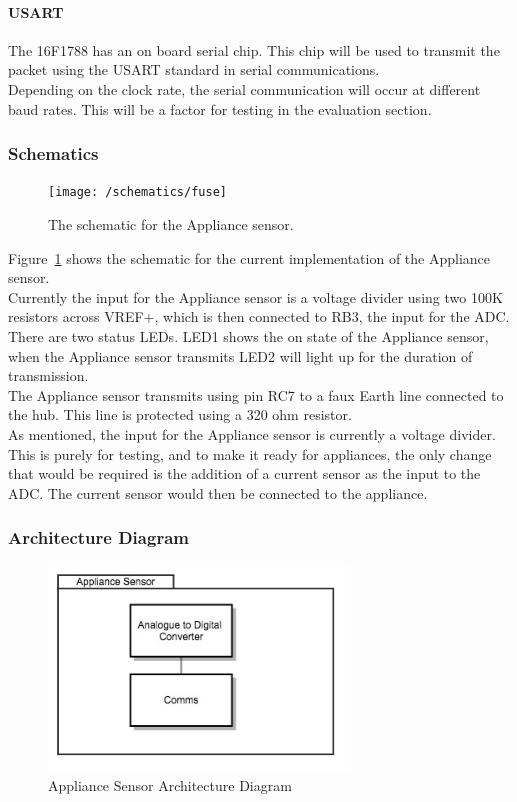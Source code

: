 \documentclass[draft,preprint,12pt,3p]{elsarticle}
\begin{document}
\paragraph{USART}
The 16F1788 has an on board serial chip. This chip will be used to transmit the packet using the USART standard in serial communications.\\
Depending on the clock rate, the serial communication will occur at different baud rates. This will be a factor for testing in the evaluation section.

\subsubsection{Schematics}
\begin{figure}[H]
    \centering
    \texttt{[image: /schematics/fuse]}
    \caption{The schematic for the Appliance sensor.}
    \label{fig:fuseschematic}
\end{figure}
Figure~\ref{fig:fuseschematic} shows the schematic for the current implementation of the Appliance sensor.\\
Currently the input for the Appliance sensor is a voltage divider using two 100K resistors across VREF+, which is then connected to RB3, the input for the ADC.\\
There are two status LEDs. LED1 shows the on state of the Appliance sensor, when the Appliance sensor transmits LED2 will light up for the duration of transmission.\\
The Appliance sensor transmits using pin RC7 to a faux Earth line connected to the hub. This line is protected using a 320 ohm resistor.\\
As mentioned, the input for the Appliance sensor is currently a voltage divider. This is purely for testing, and to make it ready for appliances, the only change that would be required is the addition of a current sensor as the input to the ADC. The current sensor would then be connected to the appliance.

\subsubsection{Architecture Diagram}

\begin{figure}[H]
    \centering
    \includegraphics[width=8cm]{diagrams/fuse}
    \caption {Appliance Sensor Architecture Diagram}
\end{figure}
\end{document}
